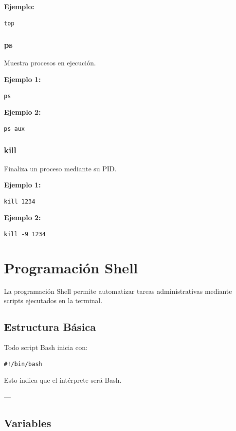 \documentclass[12pt,a4paper]{article}
\begin{document}
\textbf{Ejemplo:}
\begin{lstlisting}
top
\end{lstlisting}


\subsubsection{ps}
Muestra procesos en ejecución.

\textbf{Ejemplo 1:}
\begin{lstlisting}
ps
\end{lstlisting}

\textbf{Ejemplo 2:}
\begin{lstlisting}
ps aux
\end{lstlisting}


\subsubsection{kill}
Finaliza un proceso mediante su PID.

\textbf{Ejemplo 1:}
\begin{lstlisting}
kill 1234
\end{lstlisting}

\textbf{Ejemplo 2:}
\begin{lstlisting}
kill -9 1234
\end{lstlisting}

\section{Programación Shell}

La programación Shell permite automatizar tareas administrativas mediante scripts ejecutados en la terminal.

\subsection{Estructura Básica}

Todo script Bash inicia con:

\begin{lstlisting}
#!/bin/bash
\end{lstlisting}

Esto indica que el intérprete será Bash.

---

\subsection{Variables}
\end{document}
